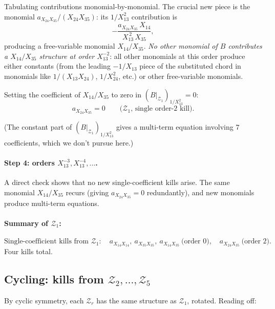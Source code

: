 \documentclass[11pt]{article}
\newcommand{\X}[2]{X_{#1#2}}
\newcommand{\Z}{\mathcal{Z}}
\theoremstyle{definition}
\begin{document}
Tabulating contributions monomial-by-monomial. The crucial new piece is
the monomial $a_{\X{2}{4}\X{3}{5}}/(\X{2}{4}\X{3}{5})$: its $1/\X{1}{3}^2$
contribution is
\[
-\frac{a_{\X{2}{4}\X{3}{5}}\,\X{1}{4}}{\X{1}{3}^{\,2}\,\X{3}{5}},
\]
producing a free-variable monomial $\X{1}{4}/\X{3}{5}$. \emph{No other
monomial of $B$ contributes a $\X{1}{4}/\X{3}{5}$ structure at order
$\X{1}{3}^{-2}$}: all other monomials at this order produce either
constants (from the leading $-1/\X{1}{3}$ piece of the substituted chord
in monomials like $1/(\X{1}{3}\X{2}{4})$, $1/\X{2}{4}^2$, etc.) or other
free-variable monomials.

Setting the coefficient of $\X{1}{4}/\X{3}{5}$ to zero in
$(B|_{\Z_1})_{1/\X{1}{3}^2}=0$:
\[
\boxed{a_{\X{2}{4}\X{3}{5}}=0\qquad\text{($\Z_1$, single order-2 kill).}}
\]

(The constant part of $(B|_{\Z_1})_{1/\X{1}{3}^2}$ gives a multi-term
equation involving $7$ coefficients, which we don't pursue here.)

\paragraph{Step 4: orders $\X{1}{3}^{-3}, \X{1}{3}^{-4}, \ldots$.}

A direct check shows that no new single-coefficient kills arise. The same
monomial $\X{1}{4}/\X{3}{5}$ recurs (giving $a_{\X{2}{4}\X{3}{5}}=0$
redundantly), and new monomials produce multi-term equations.

\paragraph{Summary of $\Z_1$:}
\[
\text{Single-coefficient kills from }\Z_1:\quad
\boxed{a_{\X{1}{4}\X{1}{4}},\ a_{\X{3}{5}\X{3}{5}},\ a_{\X{1}{4}\X{3}{5}}}\ \text{(order 0)},\quad
\boxed{a_{\X{2}{4}\X{3}{5}}}\ \text{(order 2)}.
\]
Four kills total.

\subsection{Cycling: kills from \texorpdfstring{$\Z_2,\ldots,\Z_5$}{Z2..Z5}}

By cyclic symmetry, each $\Z_r$ has the same structure as $\Z_1$, rotated.
Reading off:
\end{document}

